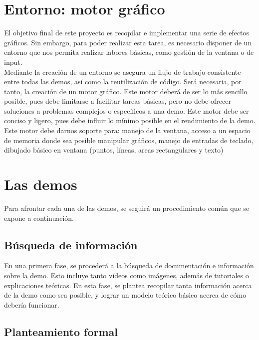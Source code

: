 \section{Entorno: motor gráfico}

El objetivo final de este proyecto es recopilar e implementar una serie de efectos gráficos. Sin embargo, para poder realizar esta tarea, es necesario disponer de un entorno que nos permita realizar labores básicas, como gestión de la ventana o de input.\\

Mediante la creación de un entorno se asegura un flujo de trabajo consistente entre todas las demos, así como la reutilización de código. Será necesaria, por tanto, la creación de un motor gráfico. Este motor deberá de ser lo más sencillo posible, pues debe limitarse a facilitar tareas básicas, pero no debe ofrecer soluciones a problemas complejos o específicos a una demo. Este motor debe ser conciso y ligero, pues debe influir lo mínimo posible en el rendimiento de la demo.\\

Este motor debe darnos soporte para: manejo de la ventana, acceso a un espacio de memoria donde sea posible manipular gráficos, manejo de entradas de teclado, dibujado básico en ventana (puntos, líneas, areas rectangulares y texto)

\section{Las demos}

Para afrontar cada una de las demos, se seguirá un procedimiento común que se expone a continuación.

\subsection{Búsqueda de información}

En una primera fase, se procederá a la búsqueda de documentación e información sobre la demo. Esto incluye tanto vídeos como imágenes, además de tutoriales o explicaciones teóricas. En esta fase, se plantea recopilar tanta información acerca de la demo como sea posible, y lograr un modelo teórico básico acerca de cómo debería funcionar.

\subsection{Planteamiento formal}

